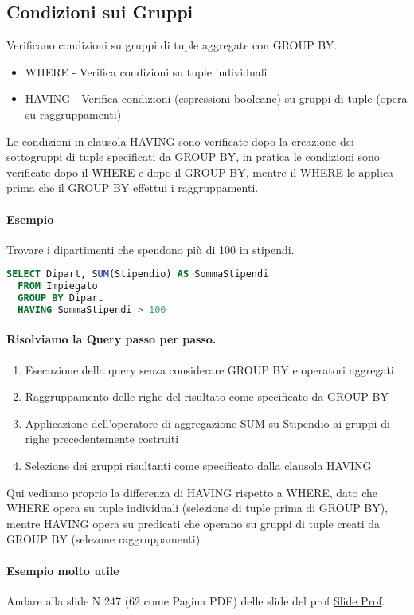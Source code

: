 \subsection{Condizioni sui Gruppi}
Verificano condizioni su gruppi di tuple aggregate con GROUP BY.
\begin{itemize}
  \item WHERE - Verifica condizioni su tuple individuali
  \item HAVING - Verifica condizioni (espressioni booleane) su gruppi di tuple
  (opera su raggruppamenti)
\end{itemize}
Le condizioni in clausola HAVING sono verificate dopo la creazione dei sottogruppi
di tuple specificati da GROUP BY, in pratica le condizioni sono verificate dopo il WHERE e dopo il GROUP BY,
mentre il WHERE le applica prima che il GROUP BY effettui i raggruppamenti.\\
\paragraph*{Esempio}
Trovare i dipartimenti che spendono più di 100 in stipendi.
\begin{lstlisting}[language=SQL]
  SELECT Dipart, SUM(Stipendio) AS SommaStipendi
  FROM Impiegato
  GROUP BY Dipart
  HAVING SommaStipendi > 100
\end{lstlisting}
\paragraph*{Risolviamo la Query passo per passo.}
\begin{enumerate}
  \item Esecuzione della query senza considerare GROUP BY e operatori
  aggregati
  \item Raggruppamento delle righe del risultato come specificato da GROUP BY
  \item Applicazione dell'operatore di aggregazione SUM su Stipendio ai gruppi di
  righe precedentemente costruiti
  \item Selezione dei gruppi risultanti come specificato dalla clausola HAVING
\end{enumerate}
Qui vediamo proprio la differenza di HAVING rispetto a WHERE, dato che
WHERE opera su tuple individuali (selezione di tuple prima di GROUP BY),
mentre HAVING opera su predicati che operano su gruppi di tuple creati da
GROUP BY (selezone raggruppamenti).
\paragraph*{Esempio molto utile} Andare alla slide N 247 (62 come Pagina PDF)
delle slide del prof \href{https://elearning.unimib.it/pluginfile.php/1533829/mod_resource/content/1/SQL.pdf}{Slide Prof}.
